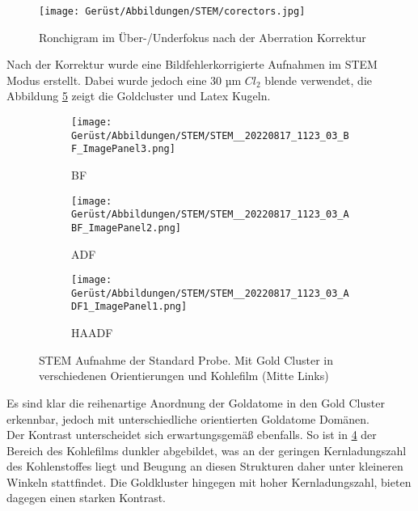 \begin{figure}[H]
     \centering
  
         \texttt{[image: Gerüst/Abbildungen/STEM/corectors.jpg]}
         \caption{Ronchigram im Über-/Underfokus nach der Aberration Korrektur}
         \label{KorrRonchi}

\end{figure}
Nach der Korrektur wurde eine Bildfehlerkorrigierte Aufnahmen im STEM Modus erstellt. Dabei wurde jedoch eine 30 µm \(Cl_2\) blende verwendet, die Abbildung \cref{STEMGold} zeigt die Goldcluster und Latex Kugeln. 
\begin{figure}
     \centering
     \begin{subfigure}[b]{0.3\textwidth}
         \centering
         \texttt{[image: Gerüst/Abbildungen/STEM/STEM\_\_20220817\_1123\_03\_BF\_ImagePanel3.png]}
         \caption{BF}
         \label{STEMGoldBF}
     \end{subfigure}
     \hfill
     \begin{subfigure}[b]{0.3\textwidth}
         \centering
         \texttt{[image: Gerüst/Abbildungen/STEM/STEM\_\_20220817\_1123\_03\_ABF\_ImagePanel2.png]}
         \caption{ADF}
         \label{STEMGoldADF}
     \end{subfigure}
     \hfill
     \begin{subfigure}[b]{0.3\textwidth}
         \centering
         \texttt{[image: Gerüst/Abbildungen/STEM/STEM\_\_20220817\_1123\_03\_ADF1\_ImagePanel1.png]}
         \caption{HAADF}
         \label{STEMGoldHAADF}
     \end{subfigure}
        \caption{STEM Aufnahme der Standard Probe. Mit Gold Cluster in verschiedenen Orientierungen und Kohlefilm (Mitte Links)}
        \label{STEMGold}
\end{figure}
Es sind klar die reihenartige Anordnung der Goldatome in den Gold Cluster erkennbar, jedoch mit unterschiedliche orientierten Goldatome Domänen.\\
Der Kontrast unterscheidet sich erwartungsgemäß ebenfalls. So ist in \cref{STEMGoldHAADF} der Bereich des Kohlefilms dunkler abgebildet, was an der geringen Kernladungszahl des Kohlenstoffes liegt und Beugung an diesen Strukturen daher unter kleineren Winkeln stattfindet. Die Goldkluster hingegen mit hoher Kernladungszahl, bieten dagegen einen starken Kontrast.


